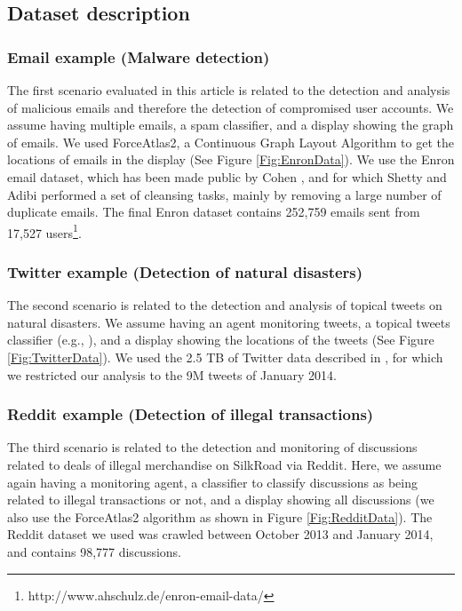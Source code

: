 \subsection{Dataset description}

\subsubsection{Email example (Malware detection)}
The first scenario evaluated in this article is related to the detection and analysis of malicious emails and therefore the detection of compromised user accounts. We assume having multiple emails, a spam classifier, and a display showing the graph of emails. We used ForceAtlas2, a Continuous Graph Layout Algorithm \cite{Jacomy2014} to get the locations of emails in the display (See Figure \ref{Fig:EnronData}).
We use the Enron email dataset, which has been made public by Cohen  \cite{Klimt2004}, and for which Shetty and Adibi \cite{Shetty2004} performed a set of
cleansing tasks, mainly by removing a large number of duplicate emails.  The final Enron dataset contains 252,759 emails sent from 17,527 users\footnote{http://www.ahschulz.de/enron-email-data/}.


\subsubsection{Twitter example (Detection of natural disasters)}
The second scenario is related to the detection and analysis of topical tweets on natural disasters. We assume having an agent monitoring tweets, a topical tweets classifier (e.g., \cite{Iman2017}), and a display showing the locations of the tweets (See Figure \ref{Fig:TwitterData}).  We used the  2.5 TB of Twitter data described in  \cite{Iman2017}, for which we restricted our analysis to the 9M tweets of January 2014.


\subsubsection{Reddit example (Detection of illegal transactions)}
The third scenario is related to the detection and monitoring of discussions related to deals of illegal merchandise on SilkRoad via Reddit. Here, we assume again having a monitoring agent, a classifier to classify discussions as being related to illegal transactions or not, and a display showing all discussions (we also use the ForceAtlas2 algorithm as shown in Figure \ref{Fig:RedditData}).
The Reddit dataset we used was crawled between October 2013 and January 2014, and contains 98,777 discussions.



